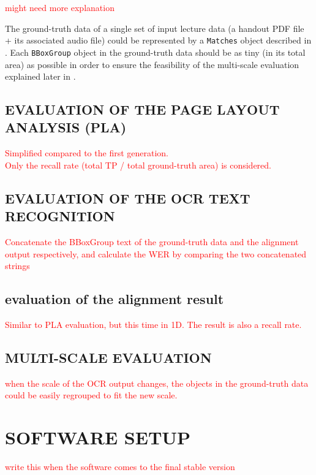 \documentclass[12pt]{article}
\begin{document}
\textcolor{red}{\large might need more explanation}

The ground-truth data of a single set of input lecture data (a handout PDF file + its associated audio file) could be represented by a \texttt{Matches} object described in . Each \texttt{BBoxGroup} object in the ground-truth data should be as tiny (in its total area) as possible in order to ensure the feasibility of the multi-scale evaluation explained later in .

\subsection{EVALUATION OF THE PAGE LAYOUT ANALYSIS (PLA)}

\textcolor{red}{Simplified compared to the first generation.\\ Only the recall rate (total TP / total ground-truth area) is considered.}

\subsection{EVALUATION OF THE OCR TEXT RECOGNITION}

\textcolor{red}{Concatenate the BBoxGroup text of the ground-truth data and the alignment output respectively, and calculate the WER by comparing the two concatenated strings}

\subsection{evaluation of the alignment result}

\textcolor{red}{Similar to PLA evaluation, but this time in 1D. The result is also a recall rate.}

\subsection{MULTI-SCALE EVALUATION}
\label{sec:multi-scale-eval}

\textcolor{red}{when the scale of the OCR output changes, the objects in the ground-truth data could be easily regrouped to fit the new scale.}


\section{SOFTWARE SETUP}

\textcolor{red}{write this when the software comes to the final stable version}
\end{document}
